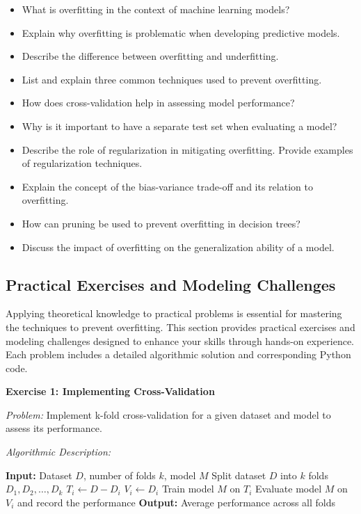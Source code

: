 \documentclass[12pt]{book} %
\begin{document}
\begin{itemize}
    \item What is overfitting in the context of machine learning models?
    \item Explain why overfitting is problematic when developing predictive models.
    \item Describe the difference between overfitting and underfitting.
    \item List and explain three common techniques used to prevent overfitting.
    \item How does cross-validation help in assessing model performance?
    \item Why is it important to have a separate test set when evaluating a model?
    \item Describe the role of regularization in mitigating overfitting. Provide examples of regularization techniques.
    \item Explain the concept of the bias-variance trade-off and its relation to overfitting.
    \item How can pruning be used to prevent overfitting in decision trees?
    \item Discuss the impact of overfitting on the generalization ability of a model.
\end{itemize}

\subsection{Practical Exercises and Modeling Challenges}
Applying theoretical knowledge to practical problems is essential for mastering the techniques to prevent overfitting. This section provides practical exercises and modeling challenges designed to enhance your skills through hands-on experience. Each problem includes a detailed algorithmic solution and corresponding Python code.

\textbf{Exercise 1: Implementing Cross-Validation}

\textit{Problem:} Implement k-fold cross-validation for a given dataset and model to assess its performance.

\textit{Algorithmic Description:}
\begin{algorithm}
\caption{K-Fold Cross-Validation}
\begin{algorithmic}[1]
\State \textbf{Input:} Dataset $D$, number of folds $k$, model $M$
\State Split dataset $D$ into $k$ folds $D_1, D_2, \ldots, D_k$
    \State $T_i \leftarrow D - D_i$ 
    \State $V_i \leftarrow D_i$ 
    \State Train model $M$ on $T_i$
    \State Evaluate model $M$ on $V_i$ and record the performance
\EndFor
\State \textbf{Output:} Average performance across all folds
\end{algorithmic}
\end{algorithm}
\end{document}
